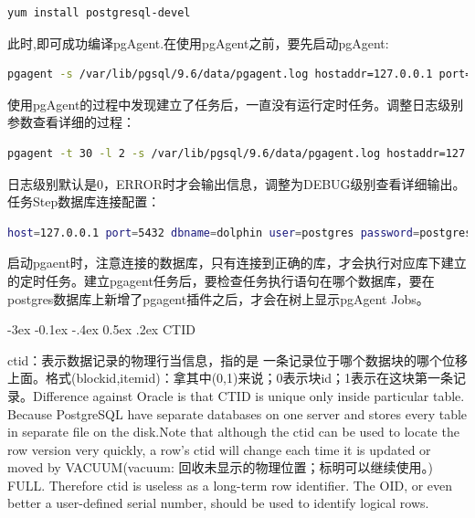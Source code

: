 \documentclass[8pt]{book}
\makeatletter
\numberwithin{dummy}{section}
\theoremstyle{ocrenumbox}
\theoremstyle{blacknumex}
\theoremstyle{blacknumbox}
\theoremstyle{ocrenum}
\renewcommand{\subsection}{\@startsection {subsection}{2}{\z@}
	{-3ex \@plus -0.1ex \@minus -.4ex}
	{0.5ex \@plus.2ex }
	{\normalfont\sffamily\bfseries}}
\makeatother
\begin{document}
\begin{lstlisting}[language=Bash]
yum install postgresql-devel
\end{lstlisting}


此时,即可成功编译pgAgent.在使用pgAgent之前，要先启动pgAgent:

\begin{lstlisting}[language=Bash]
pgagent -s /var/lib/pgsql/9.6/data/pgagent.log hostaddr=127.0.0.1 port=5432 dbname=dolphin user=postgres password=postgres
\end{lstlisting}

使用pgAgent的过程中发现建立了任务后，一直没有运行定时任务。调整日志级别参数查看详细的过程：

\begin{lstlisting}[language=Bash]
pgagent -t 30 -l 2 -s /var/lib/pgsql/9.6/data/pgagent.log hostaddr=127.0.0.1 port=5432 dbname=postgres user=postgres password=postgres
\end{lstlisting}

日志级别默认是0，ERROR时才会输出信息，调整为DEBUG级别查看详细输出。任务Step数据库连接配置：

\begin{lstlisting}[language=Bash]
host=127.0.0.1 port=5432 dbname=dolphin user=postgres password=postgres connect_timeout=10
\end{lstlisting}

启动pgaent时，注意连接的数据库，只有连接到正确的库，才会执行对应库下建立的定时任务。建立pgagent任务后，要检查任务执行语句在哪个数据库，要在postgres数据库上新增了pgagent插件之后，才会在树上显示pgAgent Jobs。

\subsection{CTID}

ctid：表示数据记录的物理行当信息，指的是 一条记录位于哪个数据块的哪个位移上面。格式(blockid,itemid)：拿其中(0,1)来说；0表示块id；1表示在这块第一条记录。Difference against Oracle is that CTID is unique only inside particular table. Because PostgreSQL have separate databases on one server and stores every table in separate file on the disk.Note that although the ctid can be used to locate the row version very quickly, a row's ctid will change each time it is updated or moved by VACUUM(vacuum: 回收未显示的物理位置；标明可以继续使用。) FULL. Therefore ctid is useless as a long-term row identifier. The OID, or even better a user-defined serial number, should be used to identify logical rows.
\end{document}
